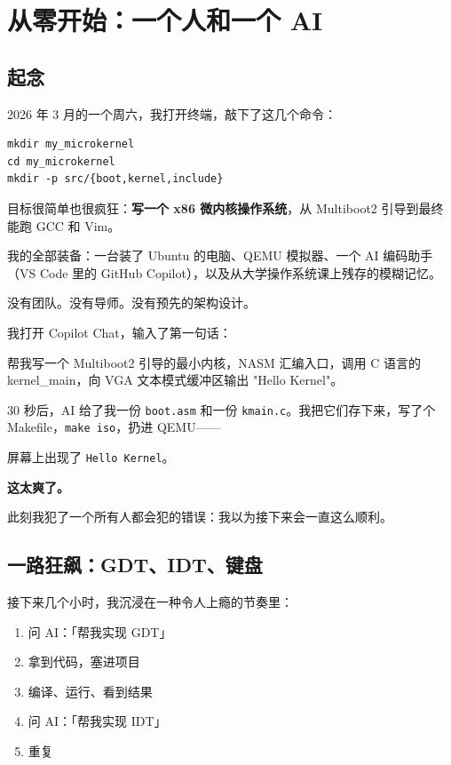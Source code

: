 \chapter{从零开始：一个人和一个 AI}

\section{起念}

2026 年 3 月的一个周六，我打开终端，敲下了这几个命令：

\begin{lstlisting}[style=shellstyle]
mkdir my_microkernel
cd my_microkernel
mkdir -p src/{boot,kernel,include}
\end{lstlisting}

目标很简单也很疯狂：\textbf{写一个 x86 微内核操作系统}，从 Multiboot2 引导到最终能跑 GCC 和 Vim。

我的全部装备：一台装了 Ubuntu 的电脑、QEMU 模拟器、一个 AI 编码助手（VS Code 里的 GitHub Copilot），以及从大学操作系统课上残存的模糊记忆。

没有团队。没有导师。没有预先的架构设计。

我打开 Copilot Chat，输入了第一句话：

\begin{humanmsg}
帮我写一个 Multiboot2 引导的最小内核，NASM 汇编入口，调用 C 语言的 kernel\_main，向 VGA 文本模式缓冲区输出 "Hello Kernel"。
\end{humanmsg}

30 秒后，AI 给了我一份 \texttt{boot.asm} 和一份 \texttt{kmain.c}。我把它们存下来，写了个 Makefile，\texttt{make iso}，扔进 QEMU——

屏幕上出现了 \texttt{Hello Kernel}。

\textbf{这太爽了。}

此刻我犯了一个所有人都会犯的错误：我以为接下来会一直这么顺利。

\section{一路狂飙：GDT、IDT、键盘}

接下来几个小时，我沉浸在一种令人上瘾的节奏里：

\begin{enumerate}
  \item 问 AI：「帮我实现 GDT」
  \item 拿到代码，塞进项目
  \item 编译、运行、看到结果
  \item 问 AI：「帮我实现 IDT」
  \item 重复
\end{enumerate}

